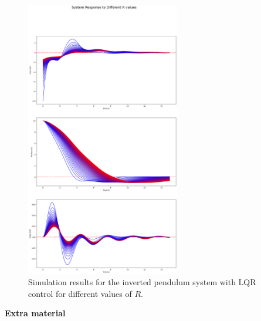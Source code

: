 \documentclass[a4 paper]{article}
\begin{document}
\begin{figure}[H]
    \centering
    \includegraphics[width=0.6\textwidth]{./figs/Different_R_values.png}
    \caption{Simulation results for the inverted pendulum system with LQR control for different values of \( R \).}
\end{figure}

    


















\newpage
\textbf{\huge{Extra material}}
\end{document}
